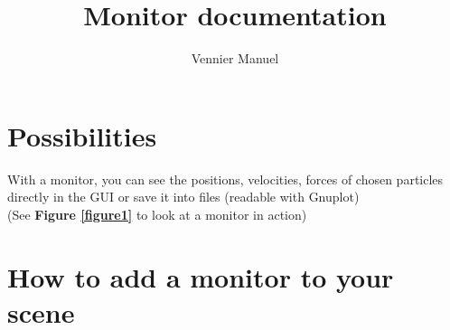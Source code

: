 \documentclass[a4paper,10pt]{article}
\title{Monitor documentation}
\author{\small {Vennier Manuel}}
\begin{document}
\lstset{language=C++}
\maketitle

\section{Possibilities}

With a monitor, you can see the positions, velocities, forces of chosen particles directly in the GUI or save it into files (readable with Gnuplot)\\
(See \textbf{Figure \ref{figure1} } to look at a monitor in action)

\section{How to add a monitor to your scene}
\end{document}

